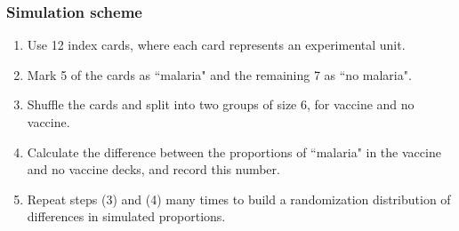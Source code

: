 \documentclass[11pt,containsverbatim,handout,xcolor=xelatex,dvipsnames,table]{beamer}
\begin{document}
\begin{frame}
\frametitle{Simulation scheme}

\begin{enumerate}

\item Use 12 index cards, where each card represents an experimental unit.

\pause

\item Mark 5 of the cards as ``malaria" and the remaining 7 as ``no malaria".

\pause

\item Shuffle the cards and split into two groups of size 6, for vaccine and no vaccine.

\pause

\item Calculate the difference between the proportions of ``malaria" in the vaccine and no vaccine decks, and record this number.

\pause

\item Repeat steps (3) and (4) many times to build a randomization distribution of differences in simulated proportions.

\end{enumerate}

\end{frame}

\end{document}
